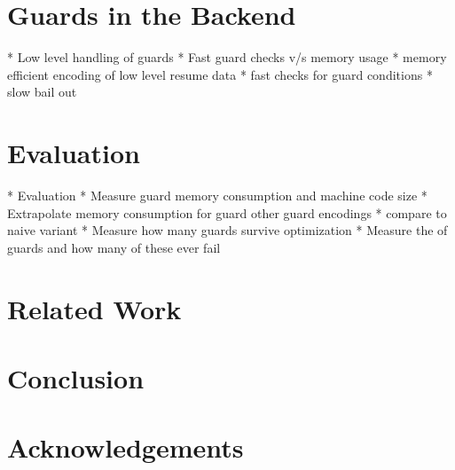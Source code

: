 \documentclass[10pt]{sigplanconf}
\begin{document}
\section{Guards in the Backend}
\label{sec:Guards in the Backend}

* Low level handling of guards
   * Fast guard checks v/s memory usage
   * memory efficient encoding of low level resume data
   * fast checks for guard conditions
   * slow bail out




\section{Evaluation}
\label{sec:evaluation}

* Evaluation
   * Measure guard memory consumption and machine code size
   * Extrapolate memory consumption for guard other guard encodings
      * compare to naive variant
   * Measure how many guards survive optimization
   * Measure the of guards and how many of these ever fail

\section{Related Work}


\section{Conclusion}


\section*{Acknowledgements}



\end{document}
